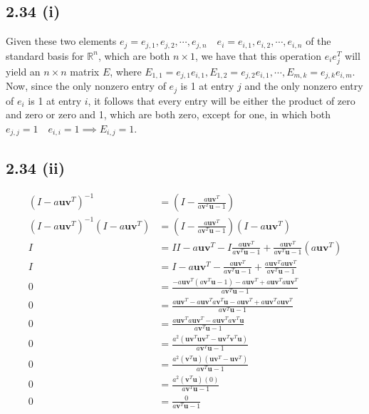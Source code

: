 \documentclass[letterpaper,12pt]{article}
\theoremstyle{definition}
\begin{document}
\subsection*{2.34 (i)}
Given these two elements $e_j = {e_{j,1}, e_{j,2}, \cdots, e_{j,n}} \quad e_i = {e_{i,1}, e_{i,2}, \cdots, e_{i,n}}$ of the standard basis for $\mathbb{R} ^n$, which are both $n \times 1$, we have that this operation $e_ie_j^T$ will yield an $n \times n$ matrix $E$, where $E_{1,1} = e_{j,1}e_{i,1}, E_{1,2} = e_{j,2}e_{i,1}, \cdots, E_{m,k} = e_{j,k}e_{i,m}$. Now, since the only nonzero entry of $e_j$ is 1 at entry $j$ and the only nonzero entry of $e_i$ is 1 at entry $i$, it follows that every entry will be either the product of zero and zero or zero and 1, which are both zero, except for one, in which both $e_{j,j} = 1 \quad e_{i,i} = 1 \implies E_{i,j} = 1$.

\subsection*{2.34 (ii)}


\begin{align*}
    (I-a\textbf{u}\textbf{v}^T)^{-1} &= \left( I - \frac{a\textbf{u}\textbf{v}^T}{a\textbf{v}^T\textbf{u}-1} \right)\\
    (I-a\textbf{u}\textbf{v}^T)^{-1}(I-a\textbf{u}\textbf{v}^T) &= \left( I - \frac{a\textbf{u}\textbf{v}^T}{a\textbf{v}^T\textbf{u}-1} \right)(I-a\textbf{u}\textbf{v}^T) \\
    I &= II  - a\textbf{u}\textbf{v}^T - I\frac{a\textbf{u}\textbf{v}^T}{a\textbf{v}^T\textbf{u}-1} + \frac{a\textbf{u}\textbf{v}^T}{a\textbf{v}^T\textbf{u}-1}(a\textbf{u}\textbf{v}^T) \\
    I &= I  - a\textbf{u}\textbf{v}^T - \frac{a\textbf{u}\textbf{v}^T}{a\textbf{v}^T\textbf{u}-1} + \frac{a\textbf{u}\textbf{v}^Ta\textbf{u}\textbf{v}^T}{a\textbf{v}^T\textbf{u}-1} \\
    0 &= \frac{- a\textbf{u}\textbf{v}^T(a\textbf{v}^T\textbf{u}-1) - a\textbf{u}\textbf{v}^T + a\textbf{u}\textbf{v}^Ta\textbf{u}\textbf{v}^T}{a\textbf{v}^T\textbf{u}-1} \\
    0 &= \frac{ a\textbf{u}\textbf{v}^T-a\textbf{u}\textbf{v}^Ta\textbf{v}^T\textbf{u} - a\textbf{u}\textbf{v}^T + a\textbf{u}\textbf{v}^Ta\textbf{u}\textbf{v}^T}{a\textbf{v}^T\textbf{u}-1} \\
    0 &= \frac{  a\textbf{u}\textbf{v}^Ta\textbf{u}\textbf{v}^T-a\textbf{u}\textbf{v}^Ta\textbf{v}^T\textbf{u}}{a\textbf{v}^T\textbf{u}-1} \\
    0 &= \frac{  a^2(\textbf{u}\textbf{v}^T\textbf{u}\textbf{v}^T-\textbf{u}\textbf{v}^T\textbf{v}^T\textbf{u})}{a\textbf{v}^T\textbf{u}-1} \\
    0 &= \frac{  a^2(\textbf{v}^T\textbf{u})(\textbf{u}\textbf{v}^T-\textbf{u}\textbf{v}^T)}{a\textbf{v}^T\textbf{u}-1} \\
    0 &= \frac{  a^2(\textbf{v}^T\textbf{u})(0)}{a\textbf{v}^T\textbf{u}-1} \\
    0 &= \frac{0}{a\textbf{v}^T\textbf{u}-1} \\
\end{align*}
\end{document}
